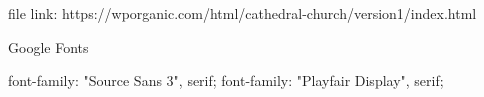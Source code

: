 file link:  https://wporganic.com/html/cathedral-church/version1/index.html

Google Fonts

font-family: "Source Sans 3", serif;
font-family: "Playfair Display", serif;
